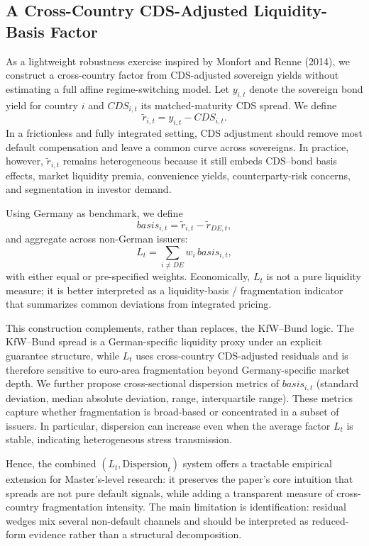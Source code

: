 \subsection{A Cross-Country CDS-Adjusted Liquidity-Basis Factor}

As a lightweight robustness exercise inspired by Monfort and Renne (2014), we construct a cross-country factor from CDS-adjusted sovereign yields without estimating a full affine regime-switching model. Let $y_{i,t}$ denote the sovereign bond yield for country $i$ and $CDS_{i,t}$ its matched-maturity CDS spread. We define
\begin{equation}
\tilde r_{i,t}=y_{i,t}-CDS_{i,t}.
\end{equation}
In a frictionless and fully integrated setting, CDS adjustment should remove most default compensation and leave a common curve across sovereigns. In practice, however, $\tilde r_{i,t}$ remains heterogeneous because it still embeds CDS--bond basis effects, market liquidity premia, convenience yields, counterparty-risk concerns, and segmentation in investor demand.

Using Germany as benchmark, we define
\begin{equation}
basis_{i,t}=\tilde r_{i,t}-\tilde r_{DE,t},
\end{equation}
and aggregate across non-German issuers:
\begin{equation}
L_t=\sum_{i\neq DE} w_i\,basis_{i,t},
\end{equation}
with either equal or pre-specified weights. Economically, $L_t$ is not a pure liquidity measure; it is better interpreted as a liquidity-basis / fragmentation indicator that summarizes common deviations from integrated pricing.

This construction complements, rather than replaces, the KfW--Bund logic. The KfW--Bund spread is a German-specific liquidity proxy under an explicit guarantee structure, while $L_t$ uses cross-country CDS-adjusted residuals and is therefore sensitive to euro-area fragmentation beyond Germany-specific market depth. We further propose cross-sectional dispersion metrics of $basis_{i,t}$ (standard deviation, median absolute deviation, range, interquartile range). These metrics capture whether fragmentation is broad-based or concentrated in a subset of issuers. In particular, dispersion can increase even when the average factor $L_t$ is stable, indicating heterogeneous stress transmission.

Hence, the combined $(L_t,\mathrm{Dispersion}_t)$ system offers a tractable empirical extension for Master's-level research: it preserves the paper's core intuition that spreads are not pure default signals, while adding a transparent measure of cross-country fragmentation intensity. The main limitation is identification: residual wedges mix several non-default channels and should be interpreted as reduced-form evidence rather than a structural decomposition.